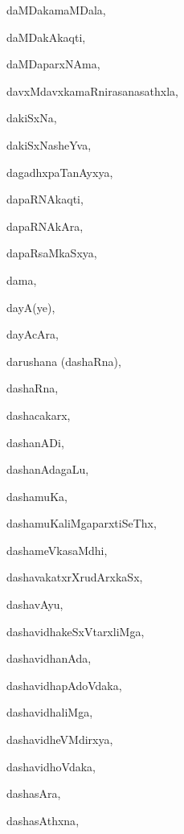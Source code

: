 \begin{multicols}{2}
{daMDakamaMDala}, \pageref{daMDakamaMDala}

{daMDakAkaqti}, \pageref{daMDakAkaqti}

{daMDaparxNAma}, \pageref{daMDaparxNAma}

{davxMdavxkamaRnirasanasathxla}, \pageref{davxMdavxkamaRnirasanasathxla}

{dakiSxNa}, \pageref{dakiSxNa}

{dakiSxNasheYva}, \pageref{dakiSxNasheYva}

{dagadhxpaTanAyxya}, \pageref{dagadhxpaTanAyxya}

{dapaRNAkaqti}, \pageref{dapaRNAkaqti}

{dapaRNAkAra}, \pageref{dapaRNAkAra}

{dapaRsaMkaSxya}, \pageref{dapaRsaMkaSxya}

{dama}, \pageref{dama}

{dayA(ye)}, \pageref{dayAye}

{dayAcAra}, \pageref{dayAcAra}

{darushana (dashaRna)}, \pageref{darushana dashaRna}

{dashaRna}, \pageref{dashaRna}

{dashacakarx}, \pageref{dashacakarx}

{dashanADi}, \pageref{dashanADi}

{dashanAda\-gaLu}, \pageref{dashanAdagaLu}

{dashamuKa}, \pageref{dashamuKa}

{dashamuKaliMgaparxtiSeThx}, \pageref{dashamuKaliMgaparxtiSeThx}

{dashameVkasaMdhi}, \pageref{dashameVkasaMdhi}

{dashavakatxrXrudArxkaSx}, \pageref{dashavakatxrXrudArxkaSx}

{dashavAyu}, \pageref{dashavAyu}

{dashavidhakeSxVtarxliMga}, \pageref{dashavidhakeSxVtarxliMga}

{dashavidhanAda}, \pageref{dashavidhanAda}

{dashavidhapAdoVdaka}, \pageref{dashavidhapAdoVdaka}

{dashavidhaliMga}, \pageref{dashavidhaliMga}

{dashavidheVMdirxya}, \pageref{dashavidheVMdirxya}

{dashavidhoVdaka}, \pageref{dashavidhoVdaka}

{dashasAra}, \pageref{dashasAra}

{dashasAthxna}, \pageref{dashasAthxna}


\end{multicols}
